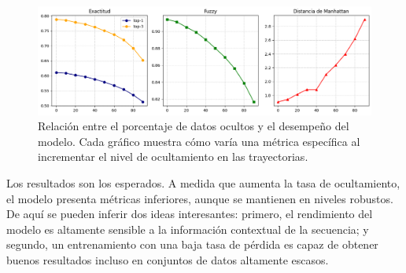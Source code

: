 \begin{figure}[!htb] \includegraphics[width=1\textwidth]{Graphics/humob_hidden_variability_analisys.png} \caption{Relación entre el porcentaje de datos ocultos y el desempeño del modelo. Cada gráfico muestra cómo varía una métrica específica al incrementar el nivel de ocultamiento en las trayectorias.} \label{fig:humob_hidden_variability_analisys} 
\end{figure}

Los resultados son los esperados. A medida que aumenta la tasa de ocultamiento, el modelo presenta métricas inferiores, aunque se mantienen en niveles robustos. De aquí se pueden inferir dos ideas interesantes: primero, el rendimiento del modelo es altamente sensible a la información contextual de la secuencia; y segundo, un entrenamiento con una baja tasa de pérdida es capaz de obtener buenos resultados incluso en conjuntos de datos altamente escasos.